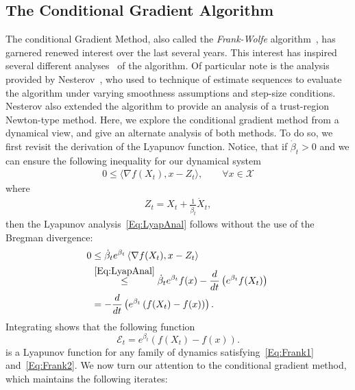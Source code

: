 \documentclass[11pt]{article}
\theoremstyle{plain}
\newcommand{\X}{{\mathcal X}}
\begin{document}
\subsection{The Conditional Gradient Algorithm}
\label{Sec:CondGrad}
 The conditional Gradient Method, also called the {\em Frank-Wolfe} algorithm~\cite{FrankWolfe}, has garnered renewed interest over the last several years. This interest has inspired several different analyses~\cite{Freund14, Bach15} of the algorithm. Of particular note is the analysis provided by Nesterov~\cite{NesterovCond15}, who used to technique of estimate sequences to evaluate the algorithm under varying smoothness assumptions and step-size conditions. Nesterov also extended the algorithm to provide an analysis of a trust-region Newton-type method. Here, we explore the conditional gradient method from a dynamical view, and give an alternate analysis of both methods. To do so, we first revisit the derivation of the Lyapunov function. Notice, that if $\dot \beta_t >0 $ and we can ensure the following inequality for our dynamical system
\begin{align}\label{Eq:Frank1} 
0 \leq \langle \nabla f(X_t), x-  Z_t\rangle, \quad \quad \forall x \in \X 
\end{align}
where 
\begin{align}\label{Eq:Frank2}
Z_t = X_t + \frac{1}{\dot \beta_t} \dot X_t,
\end{align}
then the Lyapunov analysis~\eqref{Eq:LyapAnal} follows without the use of the Bregman divergence: 
\begin{subequations}\label{Eq:LyapAnalFrank}
\begin{align}
0 &\leq  
\dot \beta_t e^{\beta_t} \left\langle \nabla f(X_t), x -Z_t\right\rangle \,  \notag\\
& \overset{\eqref{Eq:LyapAnal}}{\leq}  \dot \beta_t e^{\beta_t} f(x) -\frac{d}{dt}\left( e^{ \beta_t}  f(X_t)\right)\, \notag\\
& = -\frac{d}{dt} \left( e^{\beta_t}\left(f(X_t) - f(x)\right)\right). \notag
\end{align}
\end{subequations}
Integrating shows that the following function 
\begin{equation}\label{Eq:FrankE}
\mathcal{E}_t = e^{\beta_t} (f(X_t) - f(x)).
\end{equation} 
is a Lyapunov function for any family of dynamics satisfying~\eqref{Eq:Frank1} and~\eqref{Eq:Frank2}.  We now turn our attention to the conditional gradient method, which maintains the following iterates: 
\end{document}
